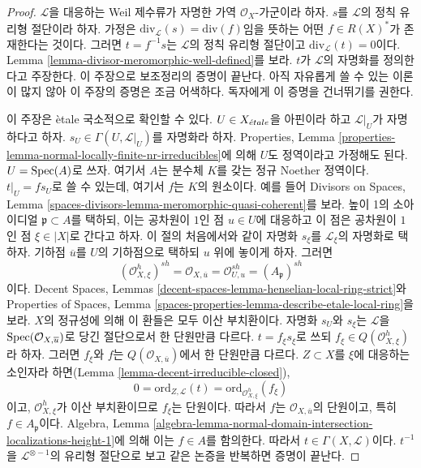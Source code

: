 \begin{proof}
$\mathcal{L}$을 대응하는 Weil 제수류가 자명한 가역
$\mathcal{O}_X$-가군이라 하자. $s$를 $\mathcal{L}$의 정칙 유리형
절단이라 하자. 가정은 $\text{div}_\mathcal{L}(s) = \text{div}(f)$임을
뜻하는 어떤 $f \in R(X)^*$가 존재한다는 것이다. 그러면
$t = f^{-1}s$는 $\mathcal{L}$의 정칙 유리형 절단이고
$\text{div}_\mathcal{L}(t) = 0$이다. Lemma
\ref{lemma-divisor-meromorphic-well-defined}를 보라. $t$가 $\mathcal{L}$의
자명화를 정의한다고 주장한다. 이 주장으로 보조정리의 증명이 끝난다.
아직 자유롭게 쓸 수 있는 이론이 많지 않아 이 주장의 증명은 조금
어색하다. 독자에게
이 증명을 건너뛰기를 권한다.

\medskip\noindent
이 주장은 \`etale 국소적으로 확인할 수 있다. $U \in X_{\acute{e}tale}$을
아핀이라 하고 $\mathcal{L}|_U$가 자명하다고 하자. $s_U \in
\Gamma(U, \mathcal{L}|_U)$를 자명화라 하자. Properties, Lemma
\ref{properties-lemma-normal-locally-finite-nr-irreducibles}에 의해 $U$도
정역이라고 가정해도 된다. $U = \mathop{\mathrm{Spec}}(A)$로 쓰자. 여기서 $A$는
분수체 $K$를 갖는 정규 Noether 정역이다. $t|_U = f s_U$로 쓸 수
있는데, 여기서 $f$는 $K$의 원소이다. 예를 들어 Divisors on Spaces, Lemma
\ref{spaces-divisors-lemma-meromorphic-quasi-coherent}를 보라. 높이 1의
소아이디얼 $\mathfrak p \subset A$를 택하되, 이는 공차원이 $1$인 점
$u \in U$에 대응하고 이 점은 공차원이 $1$인 점 $\xi \in |X|$로
간다고 하자. 이 절의 처음에서와 같이 자명화 $s_\xi$를
$\mathcal{L}_\xi$의 자명화로 택하자. 기하점 $\overline{u}$를 $U$의
기하점으로 택하되 $u$ 위에 놓이게 하자. 그러면
$$
(\mathcal{O}_{X, \xi}^h)^{sh} =
\mathcal{O}_{X, \overline{u}} =
\mathcal{O}_{U, u}^{sh} = (A_\mathfrak p)^{sh}
$$
이다. Decent Spaces, Lemmas
\ref{decent-spaces-lemma-henselian-local-ring-strict}와 Properties of Spaces,
Lemma \ref{spaces-properties-lemma-describe-etale-local-ring}을 보라. $X$의
정규성에 의해 이 환들은 모두 이산 부치환이다. 자명화 $s_U$와 $s_\xi$는
$\mathcal{L}$을 $\mathop{\mathrm{Spec}}(\mathcal{O}_{X, \overline{u}})$로 당긴 절단으로서
한 단원만큼 다르다. $t = f_\xi s_\xi$로 쓰되
$f_\xi \in Q(\mathcal{O}_{X, \xi}^h)$라 하자. 그러면 $f_\xi$와 $f$는
$Q(\mathcal{O}_{X, \overline{u}})$에서 한 단원만큼 다르다.
$Z \subset X$를 $\xi$에 대응하는 소인자라 하면(Lemma
\ref{lemma-decent-irreducible-closed}),
$$
0 = \text{ord}_{Z, \mathcal{L}}(t) =
\text{ord}_{\mathcal{O}_{X, \xi}^h}(f_\xi)
$$
이고, $\mathcal{O}_{X, \xi}^h$가 이산 부치환이므로 $f_\xi$는 단원이다.
따라서 $f$는 $\mathcal{O}_{X, \overline{u}}$의 단원이고, 특히
$f \in A_\mathfrak p$이다. Algebra, Lemma
\ref{algebra-lemma-normal-domain-intersection-localizations-height-1}에 의해
이는 $f \in A$를 함의한다. 따라서 $t \in \Gamma(X, \mathcal{L})$이다.
$t^{-1}$을 $\mathcal{L}^{\otimes -1}$의 유리형 절단으로 보고 같은 논증을
반복하면 증명이 끝난다.
\end{proof}


















